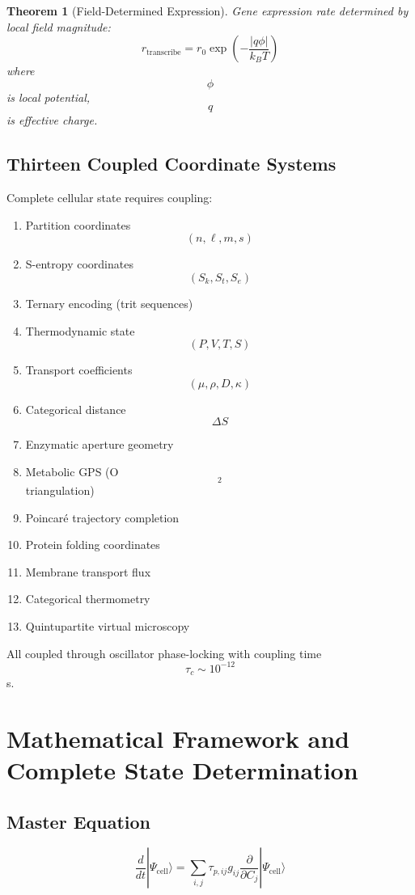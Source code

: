 \documentclass[11pt,twocolumn,a4paper]{article}
\newtheorem{theorem}{Theorem}[section]
\theoremstyle{remark}
\begin{document}
\begin{theorem}[Field-Determined Expression]
\label{thm:field_expression}
Gene expression rate determined by local field magnitude:
$$
r_{\mathrm{transcribe}} = r_0 \exp\left(-\frac{|q\phi|}{k_B T}\right)
$$
where $$\phi$$ is local potential, $$q$$ is effective charge.
\end{theorem}

\subsection{Thirteen Coupled Coordinate Systems}

Complete cellular state requires coupling:
\begin{enumerate}
\item Partition coordinates $$(n,\ell,m,s)$$
\item S-entropy coordinates $$(S_k,S_t,S_e)$$
\item Ternary encoding (trit sequences)
\item Thermodynamic state $$(P,V,T,S)$$
\item Transport coefficients $$(\mu,\rho,D,\kappa)$$
\item Categorical distance $$\Delta S$$
\item Enzymatic aperture geometry
\item Metabolic GPS (O$$_2$$ triangulation)
\item Poincaré trajectory completion
\item Protein folding coordinates
\item Membrane transport flux
\item Categorical thermometry
\item Quintupartite virtual microscopy
\end{enumerate}

All coupled through oscillator phase-locking with coupling time $$\tau_c \sim 10^{-12}$$ s.



\section{Mathematical Framework and Complete State Determination}
\label{sec:framework}

\subsection{Master Equation}

\begin{equation}
\frac{d}{dt}|\Psi_{\mathrm{cell}}\rangle = \sum_{i,j} \tau_{p,ij} g_{ij} \frac{\partial}{\partial C_j}|\Psi_{\mathrm{cell}}\rangle
\end{equation}
\end{document}
